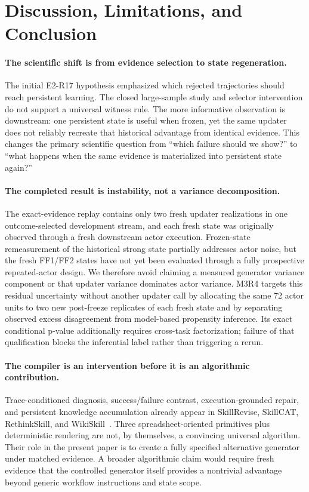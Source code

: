 \section{Discussion, Limitations, and Conclusion}
\label{sec:discussion}

\paragraph{The scientific shift is from evidence selection to state regeneration.}
The initial E2-R17 hypothesis emphasized which rejected trajectories should reach persistent learning. The closed large-sample study and selector intervention do not support a universal witness rule. The more informative observation is downstream: one persistent state is useful when frozen, yet the same updater does not reliably recreate that historical advantage from identical evidence. This changes the primary scientific question from ``which failure should we show?'' to ``what happens when the same evidence is materialized into persistent state again?''

\paragraph{The completed result is instability, not a variance decomposition.}
The exact-evidence replay contains only two fresh updater realizations in one outcome-selected development stream, and each fresh state was originally observed through a fresh downstream actor execution. Frozen-state remeasurement of the historical strong state partially addresses actor noise, but the fresh FF1/FF2 states have not yet been evaluated through a fully prospective repeated-actor design. We therefore avoid claiming a measured generator variance component or that updater variance dominates actor variance. M3R4 targets this residual uncertainty without another updater call by allocating the same 72 actor units to two new post-freeze replicates of each fresh state and by separating observed excess disagreement from model-based propensity inference. Its exact conditional p-value additionally requires cross-task factorization; failure of that qualification blocks the inferential label rather than triggering a rerun.

\paragraph{The compiler is an intervention before it is an algorithmic contribution.}
Trace-conditioned diagnosis, success/failure contrast, execution-grounded repair, and persistent knowledge accumulation already appear in SkillRevise, SkillCAT, RethinkSkill, and WikiSkill~\citep{liu2026skillrevise,chen2026skillcat,liu2026rethinkskill,tang2026wikiskill}. Three spreadsheet-oriented primitives plus deterministic rendering are not, by themselves, a convincing universal algorithm. Their role in the present paper is to create a fully specified alternative generator under matched evidence. A broader algorithmic claim would require fresh evidence that the controlled generator itself provides a nontrivial advantage beyond generic workflow instructions and state scope.

